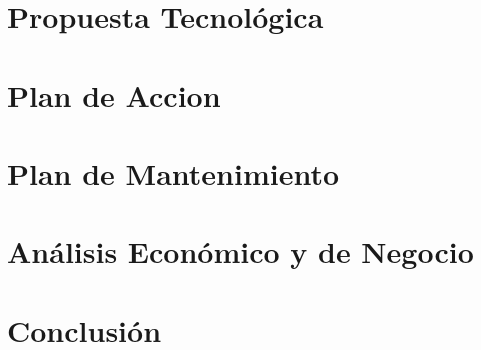 \documentclass[12pt,letterpaper]{article}
\begin{document}
	
	
	
	

	
	




\part{Propuesta Tecnológica}\label{propuesta-tecno}
	


\part{Plan de Accion}\label{plan-accion}
	


\part{Plan de Mantenimiento}\label{plan-mantenimiento}
	


\part{Análisis Económico y de Negocio}\label{analisis-economico}
	
	
	
	


\part{Conclusión}\label{conclusion}
	

 
\end{document}
